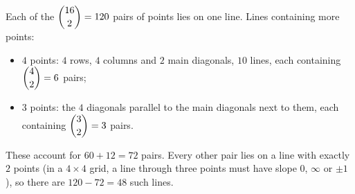 Each of the $\dbinom{16}{2}=120$ pairs of points lies on one line. Lines containing more points:
\begin{itemize}
\item $4$ points: $4$ rows, $4$ columns and $2$ main diagonals, $10$ lines, each containing $\dbinom42=6$ pairs;
\item $3$ points: the $4$ diagonals parallel to the main diagonals next to them, each containing $\dbinom32=3$ pairs.
\end{itemize}
These account for $60+12=72$ pairs. Every other pair lies on a line with exactly $2$ points (in a $4\times4$ grid, a line through three points must have slope $0$, $\infty$ or $\pm1$), so there are $120-72=\boxed{48}$ such lines.
